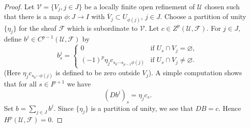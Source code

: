 \begin{proof}
Let $\mathcal V=\{V_j,j\in J\}$ be a locally finite open refinement of $\mathcal U$ chosen such that there is a map $\phi:J\to I$ with $\overline V_j\subset U_{\phi(j)}$, $j\in J$. Choose a partition of unity $\{\eta_j\}$ for the sheaf $\mathcal F$ which is subordinate to $\mathcal V$. Let $c\in Z^p(\mathcal U,\mathcal F)$. For $j\in J$, define $b^j\in C^{p-1}(\mathcal U,\mathcal F)$ by
\[
b_s^j=\begin{cases}0&\text{if }U_s\cap V_j=\varnothing,\\(-1)^p\eta_jc_{s_0\cdots s_{p-1}\phi(j)}&\text{if }U_s\cap V_j\neq\varnothing.\end{cases}
\]
(Here $\eta_jc_{s_0\cdots\phi(j)}$ is defined to be zero outside $V_j$). A simple computation shows that for all $s\in I^{p+1}$ we have
\[
(Db^j)_s=\eta_jc_s.
\]
Set $b=\sum_{j\in J}b^j$. Since $\{\eta_j\}$ is a partition of unity, we see that $DB=c$. Hence $H^p(\mathcal U,\mathcal F)=0$.
\end{proof}
